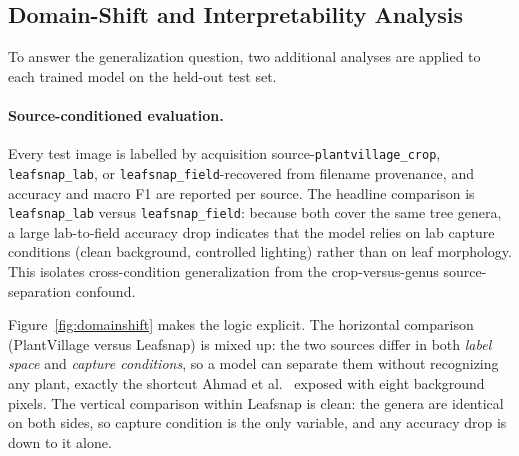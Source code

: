 \documentclass[12pt,a4paper]{article}
\begin{document}
\subsection{Domain-Shift and Interpretability Analysis}
\label{sec:domainshift}
To answer the generalization question, two additional analyses are applied to each trained model on the held-out test set.

\paragraph{Source-conditioned evaluation.} Every test image is labelled by acquisition source-\texttt{plantvillage\_crop}, \texttt{leafsnap\_lab}, or \texttt{leafsnap\_field}-recovered from filename provenance, and accuracy and macro F1 are reported per source. The headline comparison is \texttt{leafsnap\_lab} versus \texttt{leafsnap\_field}: because both cover the same tree genera, a large lab-to-field accuracy drop indicates that the model relies on lab capture conditions (clean background, controlled lighting) rather than on leaf morphology. This isolates cross-condition generalization from the crop-versus-genus source-separation confound.

Figure~\ref{fig:domainshift} makes the logic explicit. The horizontal comparison (PlantVillage versus Leafsnap) is mixed up: the two sources differ in both \emph{label space} and \emph{capture conditions}, so a model can separate them without recognizing any plant, exactly the shortcut Ahmad et al.~\cite{ahmad2023} exposed with eight background pixels. The vertical comparison within Leafsnap is clean: the genera are identical on both sides, so capture condition is the only variable, and any accuracy drop is down to it alone.
\end{document}
